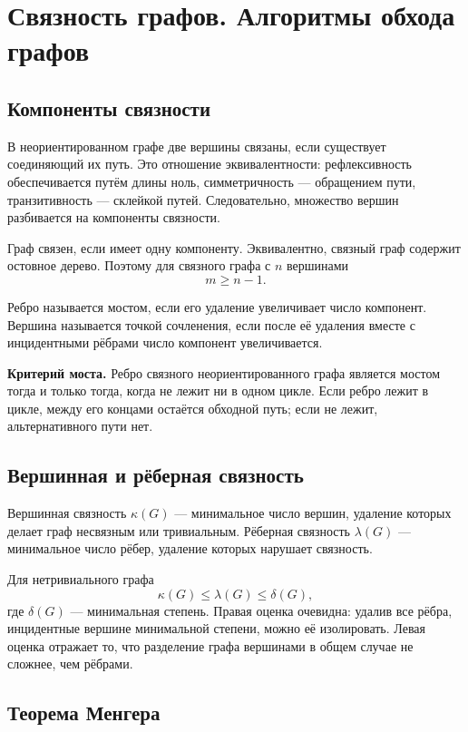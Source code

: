 \section{Связность графов. Алгоритмы обхода графов}
\label{sec:graph-connectivity}

\subsection{Компоненты связности}

В неориентированном графе две вершины связаны, если существует соединяющий их
путь. Это отношение эквивалентности: рефлексивность обеспечивается путём длины
ноль, симметричность --- обращением пути, транзитивность --- склейкой путей.
Следовательно, множество вершин разбивается на компоненты связности.

Граф связен, если имеет одну компоненту. Эквивалентно, связный граф содержит
остовное дерево. Поэтому для связного графа с $n$ вершинами
\[
    m\ge n-1.
\]

Ребро называется мостом, если его удаление увеличивает число компонент.
Вершина называется точкой сочленения, если после её удаления вместе с
инцидентными рёбрами число компонент увеличивается.

\textbf{Критерий моста.} Ребро связного неориентированного графа является мостом
тогда и только тогда, когда не лежит ни в одном цикле. Если ребро лежит в цикле,
между его концами остаётся обходной путь; если не лежит, альтернативного пути
нет.

\subsection{Вершинная и рёберная связность}

Вершинная связность $\kappa(G)$ --- минимальное число вершин, удаление которых
делает граф несвязным или тривиальным. Рёберная связность $\lambda(G)$ ---
минимальное число рёбер, удаление которых нарушает связность.

Для нетривиального графа
\[
    \kappa(G)\le \lambda(G)\le \delta(G),
\]
где $\delta(G)$ --- минимальная степень. Правая оценка очевидна: удалив все
рёбра, инцидентные вершине минимальной степени, можно её изолировать. Левая
оценка отражает то, что разделение графа вершинами в общем случае не сложнее,
чем рёбрами.

\subsection{Теорема Менгера}

